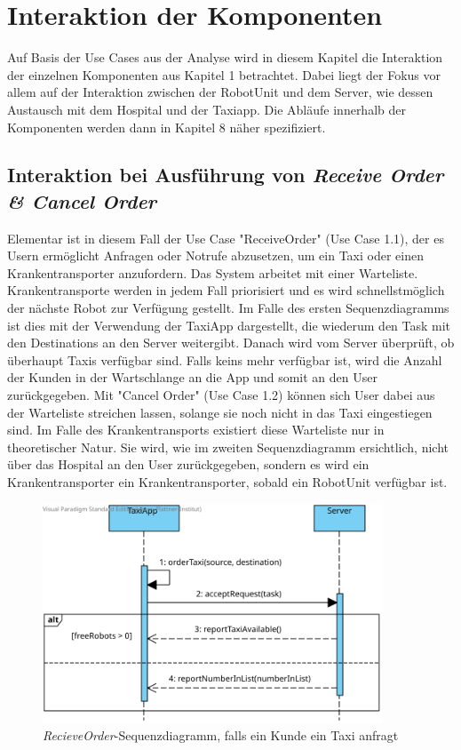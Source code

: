 \section{Interaktion der Komponenten}
Auf Basis der Use Cases aus der Analyse wird in diesem Kapitel die Interaktion der einzelnen Komponenten aus Kapitel 1 betrachtet. 
Dabei liegt der Fokus vor allem auf der Interaktion zwischen der RobotUnit und dem Server, wie dessen Austausch mit dem Hospital und der Taxiapp. 
Die Abläufe innerhalb der Komponenten werden dann in Kapitel 8 näher spezifiziert. \\


\subsection*{Interaktion bei Ausführung von \emph{Receive Order \& Cancel Order}}

Elementar ist in diesem Fall der Use Case "ReceiveOrder" (Use Case 1.1), der es Usern ermöglicht Anfragen oder Notrufe abzusetzen, um ein Taxi oder einen Krankentransporter anzufordern. 
Das System arbeitet mit einer Warteliste. 
Krankentransporte werden in jedem Fall priorisiert und es wird schnellstmöglich der nächste Robot zur Verfügung gestellt. 
Im Falle des ersten Sequenzdiagramms ist dies mit der Verwendung der TaxiApp dargestellt, die wiederum den Task mit den Destinations an den Server weitergibt. 
Danach wird vom Server überprüft, ob überhaupt Taxis verfügbar sind.
Falls keins mehr verfügbar ist, wird die Anzahl der Kunden in der Wartschlange an die App und somit an den User zurückgegeben. 
Mit "Cancel Order" (Use Case 1.2) können sich User dabei aus der Warteliste streichen lassen, solange sie noch nicht in das Taxi eingestiegen sind. 
Im Falle des Krankentransports existiert diese Warteliste nur in theoretischer Natur. 
Sie wird, wie im zweiten Sequenzdiagramm ersichtlich, nicht über das Hospital an den User zurückgegeben, sondern es wird ein Krankentransporter ein Krankentransporter, sobald ein RobotUnit verfügbar ist. \\

\begin{figure}[H]
	\centering
	\includegraphics[width=0.9\textwidth]{img/2-Entwurf-ReceiveOrder-Taxi}
	\caption{\emph{RecieveOrder}-Sequenzdiagramm, falls ein Kunde ein Taxi anfragt}
	\label{SequenzDiagrammInteraktion}
\end{figure}

